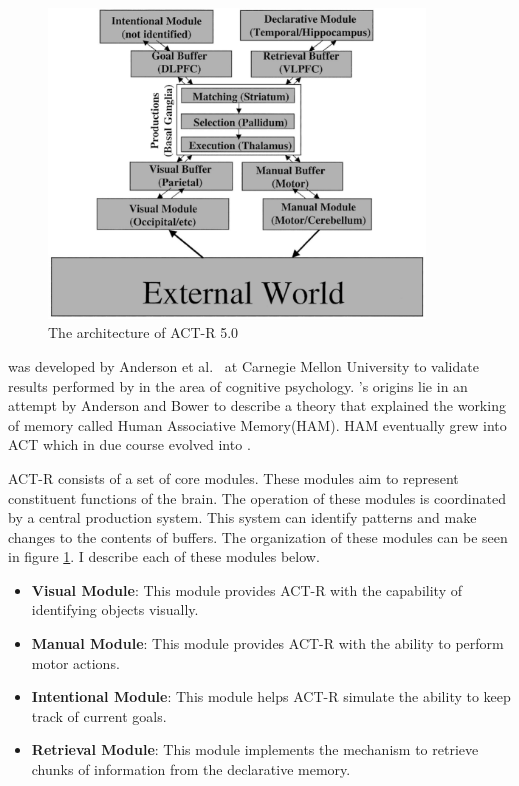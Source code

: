 \begin{figure}[htp]
  \centering
  \includegraphics[width=100mm]{ACTRArch.eps}
  \caption{The architecture of ACT-R 5.0\cite{anderson_jr-etal:2004a}}
  \label{ACTR_ARCH}
\end{figure}



\actr was developed by Anderson et al.~\cite{anderson_jr-etal:2004a}
at Carnegie Mellon University to validate results performed by in the
area of cognitive psychology. \actr's origins lie in an attempt by
Anderson and Bower to describe a theory that explained the working of
memory called Human Associative Memory(HAM)\cite{AndersonBower73}. HAM
eventually grew into {\small ACT}\cite{Anderson76} which in due course evolved
into \actr\cite{Anderson83}.

ACT-R consists of a set of core modules. These modules aim to
represent constituent functions of the brain. The operation of these
modules is coordinated by a central production system. This system can
identify patterns and make changes to the contents of buffers. The
organization of these modules can be seen in figure \ref{ACTR_ARCH}. I
describe each of these modules below.

\begin{itemize}
\item {\bf Visual Module}: This module provides ACT-R with the capability of
  identifying objects visually.
\item {\bf Manual Module}: This module provides ACT-R with the ability to
  perform motor actions.
\item {\bf Intentional Module}: This module helps ACT-R simulate the
  ability to keep track of current goals.
\item {\bf Retrieval Module}: This module implements the mechanism to
  retrieve chunks of information from the declarative memory.
\end{itemize}

